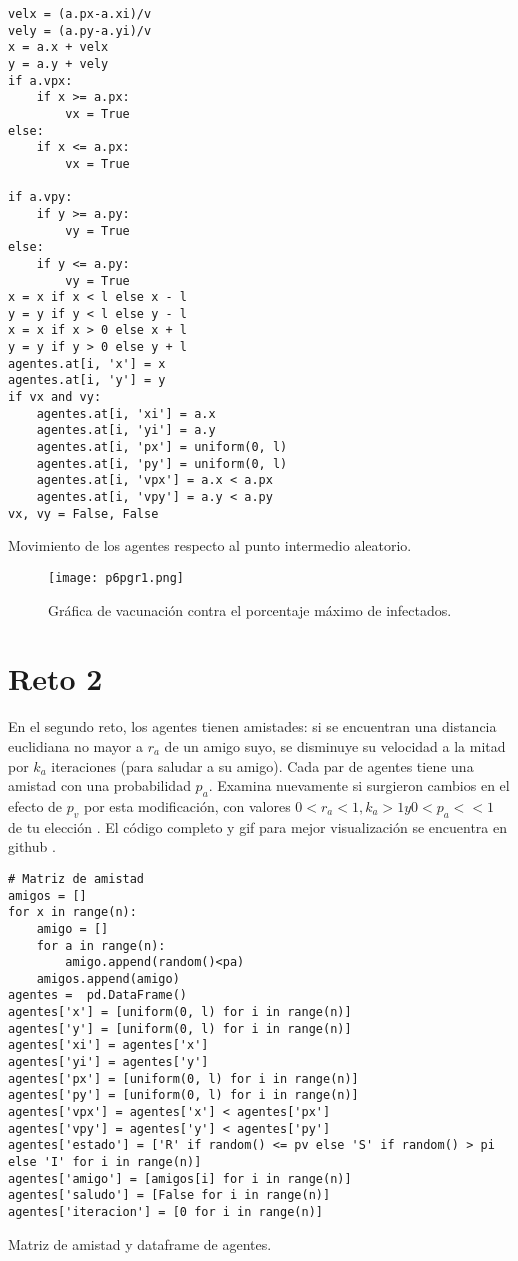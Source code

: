 \documentclass{article}
\begin{document}
\renewcommand{\listingscaption}{Código}
\begin{listing}[H]
  \begin{verbatim}
velx = (a.px-a.xi)/v
vely = (a.py-a.yi)/v
x = a.x + velx
y = a.y + vely
if a.vpx:
    if x >= a.px:
        vx = True
else:
    if x <= a.px:
        vx = True

if a.vpy:
    if y >= a.py:
        vy = True      
else:
    if y <= a.py:
        vy = True
x = x if x < l else x - l
y = y if y < l else y - l
x = x if x > 0 else x + l
y = y if y > 0 else y + l
agentes.at[i, 'x'] = x
agentes.at[i, 'y'] = y
if vx and vy:
    agentes.at[i, 'xi'] = a.x
    agentes.at[i, 'yi'] = a.y
    agentes.at[i, 'px'] = uniform(0, l)
    agentes.at[i, 'py'] = uniform(0, l)
    agentes.at[i, 'vpx'] = a.x < a.px
    agentes.at[i, 'vpy'] = a.y < a.py
vx, vy = False, False
  \end{verbatim}
  \label{lst:fibo}
  \caption{Movimiento de los agentes respecto al punto intermedio aleatorio.}
\end{listing}

\begin{figure}[H]
\centering
\texttt{[image: p6pgr1.png]}
\caption{\label{fig3}Gráfica de vacunación contra el porcentaje máximo de infectados.}
\end{figure}


\section{Reto 2}
En el segundo reto, los agentes tienen amistades: si se encuentran una distancia euclidiana no mayor a $r_{a}$ de un amigo suyo, se disminuye su velocidad a la mitad por $k_{a}$ iteraciones (para saludar a su amigo). Cada par de agentes tiene una amistad con una probabilidad $p_{a}$. Examina nuevamente si surgieron cambios en el efecto de $p_{v}$ por esta modificación, con valores $0 < r_{a} < 1, k_{a} > 1 y 0 < p_{a} << 1$ de tu elección \cite{Satu_Elisa_Schaeffer}. El código completo y gif para mejor visualización se encuentra en github \cite{Denisse_Leyva}.


\renewcommand{\listingscaption}{Código}
\begin{listing}[H]
  \begin{verbatim}
# Matriz de amistad
amigos = []
for x in range(n):
    amigo = [] 
    for a in range(n):
        amigo.append(random()<pa)
    amigos.append(amigo)
agentes =  pd.DataFrame()
agentes['x'] = [uniform(0, l) for i in range(n)]
agentes['y'] = [uniform(0, l) for i in range(n)]
agentes['xi'] = agentes['x']
agentes['yi'] = agentes['y']
agentes['px'] = [uniform(0, l) for i in range(n)]
agentes['py'] = [uniform(0, l) for i in range(n)]
agentes['vpx'] = agentes['x'] < agentes['px']
agentes['vpy'] = agentes['y'] < agentes['py']
agentes['estado'] = ['R' if random() <= pv else 'S' if random() > pi else 'I' for i in range(n)]
agentes['amigo'] = [amigos[i] for i in range(n)]
agentes['saludo'] = [False for i in range(n)]
agentes['iteracion'] = [0 for i in range(n)]
  \end{verbatim}
  \label{lst:fibo}
  \caption{Matriz de amistad y dataframe de agentes.}
\end{listing}
\end{document}
